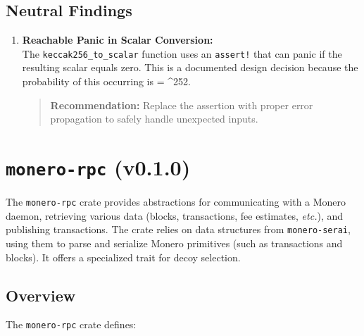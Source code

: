 \documentclass[12pt,a4paper]{article}
\begin{document}
\subsection{Neutral Findings}
\begin{enumerate}
    \item \textbf{Reachable Panic in Scalar Conversion:} \\
    The \texttt{keccak256\_to\_scalar} function uses an \texttt{assert!} that can panic if the resulting scalar equals zero.  This is a documented design decision because the probability of this occurring is \approx {} = ^{252}.
    \begin{quote}
     \textbf{Recommendation:} Replace the assertion with proper error propagation to safely handle unexpected inputs.
    \end{quote}
\end{enumerate}



\section{\texttt{monero-rpc} (v0.1.0)}
\label{sec:monero-rpc-crate}

The \texttt{monero-rpc} crate provides abstractions for
communicating with a Monero daemon, retrieving various data (blocks, transactions,
fee estimates, \emph{etc.}), and publishing transactions.  The crate relies on data
structures from \texttt{monero-serai}, using them to parse and serialize Monero
primitives (such as transactions and blocks).  It offers a specialized trait for
decoy selection.

\subsection{Overview}
\label{sec:monero-rpc-overview}

The \texttt{monero-rpc} crate defines:
\end{document}
